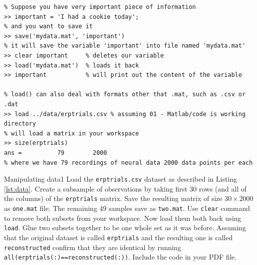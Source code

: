 \documentclass[a4paper,11pt]{article}
\begin{document}
%
%
\begin{lstlisting}[caption={Working with data},label={lst:data}]
% There are two great functions in Matlab: 'save' and 'load'.
% Suppose you have very important piece of information
>> important = 'I had a cookie today';
% and you want to save it
>> save('mydata.mat', 'important')
% it will save the variable 'important' into file named 'mydata.mat'
>> clear important     % deletes our variable
>> load('mydata.mat')  % loads it back
>> important           % will print out the content of the variable

% load() can also deal with formats other that .mat, such as .csv or .dat
>> load ../data/erptrials.csv % assuming 01 - Matlab/code is working directory
% will load a matrix in your workspace
>> size(erptrials)
ans =          79        2000
% where we have 79 recordings of neural data 2000 data points per each
\end{lstlisting}


%
%
\begin{exercise}{2}{Manipulating data}{1}
Load the \texttt{erptrials.csv} dataset as described in Listing \ref{lst:data}. Create a subsample of observations by taking first 30 rows (and all of the columns) of the \texttt{erptrials} matrix. Save the resulting matrix of size $30 \times 2000$ as \texttt{one.mat} file. The remaining 49 samples save as \texttt{two.mat}. Use \texttt{clear} command to remove both subsets from your workspace. Now load them both back using \texttt{load}. Glue two subsets together to be one whole set as it was before. Assuming that the original dataset is called \texttt{erptrials} and the resulting one is called \texttt{reconstructed} confirm that they are identical by running \texttt{all(erptrials(:)==reconstructed(:))}. Include the code in your PDF file.
\end{exercise}
\end{document}
